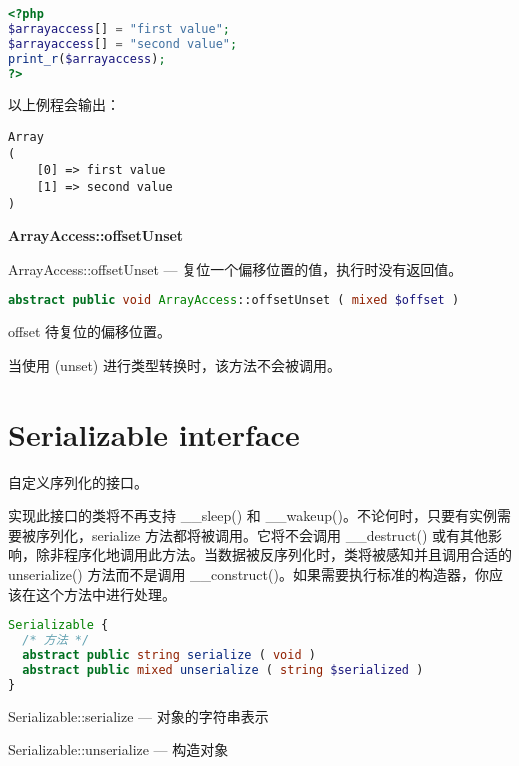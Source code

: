 \begin{lstlisting}[language=PHP]
<?php
$arrayaccess[] = "first value";
$arrayaccess[] = "second value";
print_r($arrayaccess);
?>
\end{lstlisting}

以上例程会输出：

\begin{verbatim}
Array
(
    [0] => first value
    [1] => second value
)
\end{verbatim}

\textbf{ArrayAccess::offsetUnset}

ArrayAccess::offsetUnset — 复位一个偏移位置的值，执行时没有返回值。



\begin{lstlisting}[language=PHP]
abstract public void ArrayAccess::offsetUnset ( mixed $offset )
\end{lstlisting}

\begin{compactitem}
\item offset
待复位的偏移位置。
\end{compactitem}

当使用 (unset) 进行类型转换时，该方法不会被调用。


\section{Serializable interface}

自定义序列化的接口。

实现此接口的类将不再支持 \_\_sleep() 和 \_\_wakeup()。不论何时，只要有实例需要被序列化，serialize 方法都将被调用。它将不会调用 \_\_destruct() 或有其他影响，除非程序化地调用此方法。当数据被反序列化时，类将被感知并且调用合适的 unserialize() 方法而不是调用 \_\_construct()。如果需要执行标准的构造器，你应该在这个方法中进行处理。



\begin{lstlisting}[language=PHP]
Serializable {
  /* 方法 */
  abstract public string serialize ( void )
  abstract public mixed unserialize ( string $serialized )
}
\end{lstlisting}

\begin{compactitem}
\item Serializable::serialize — 对象的字符串表示
\item Serializable::unserialize — 构造对象
\end{compactitem}


